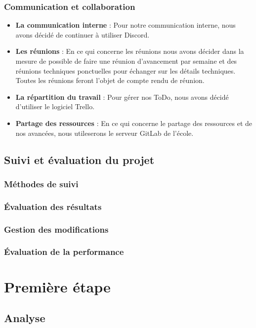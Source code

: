 \documentclass[a4paper, 12pt]{report}
\begin{document}
        \subsection{Communication et collaboration}

\begin{itemize}
    \item \textbf{La communication interne} : Pour notre communication interne, nous avons décidé de continuer à utiliser Discord.
    \item \textbf{Les réunions} : En ce qui concerne les réunions nous avons décider dans la mesure de possible de faire une réunion d'avancement par semaine et des réunions techniques ponctuelles pour échanger sur les détails techniques. Toutes les réunions feront l'objet de compte rendu de réunion.
    \item \textbf{La répartition du travail} : Pour gérer nos ToDo, nous avons décidé d'utiliser le logiciel Trello.
    \item \textbf{Partage des ressources} : En ce qui concerne le partage des ressources et de nos avancées, nous utileserons le serveur GitLab de l'école.
\end{itemize}


\clearpage
    \section{Suivi et évaluation du projet}
        \subsection{Méthodes de suivi}
        \subsection{Évaluation des résultats}
        \subsection{Gestion des modifications}
        \subsection{Évaluation de la performance}
    

\chapter{Première étape}
\minitoc
{}
\clearpage
    \section{Analyse}
\end{document}
